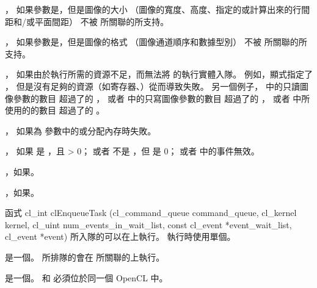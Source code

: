 \item {}，
如果參數是，但是圖像的大小
（圖像的寬度、高度、指定的或計算出來的行間距和/或平面間距）
不被  所關聯的所支持。

\item {}，
如果參數是，但是圖像的格式
（圖像通道順序和數據型別）
不被  所關聯的所支持。

\item {}，
如果由於執行所需的資源不足，而無法將  的執行實體入隊。
例如，顯式指定了 ，
但是沒有足夠的資源（如寄存器、）從而導致失敗。
另一個例子， 中的只讀圖像參數的數目
超過了的 ，
或者 中的只寫圖像參數的數目
超過了的 ，
或者 中所使用的的數目
超過了的 。

\item {}，
如果為  參數中的或分配內存時失敗。

\item {}，
  如果  是 ，且  > 0；
  或者  不是 ，但  是 0；
  或者  中的事件無效。

\item {}，如果\scdevfailres。

\item {}，如果\schostfailres。
\stopigBase

函式
\startCLFUNC
cl_int
clEnqueueTask (cl_command_queue command_queue,
		cl_kernel kernel,
		cl_uint num_events_in_wait_list,
		const cl_event *event_wait_list,
		cl_event *event)
\stopCLFUNC
所入隊的可以在上執行。
執行時使用單個。

 是一個。
所排隊的會在  所關聯的上執行。

 是一個。
  和  必須位於同一個 OpenCL 中。

